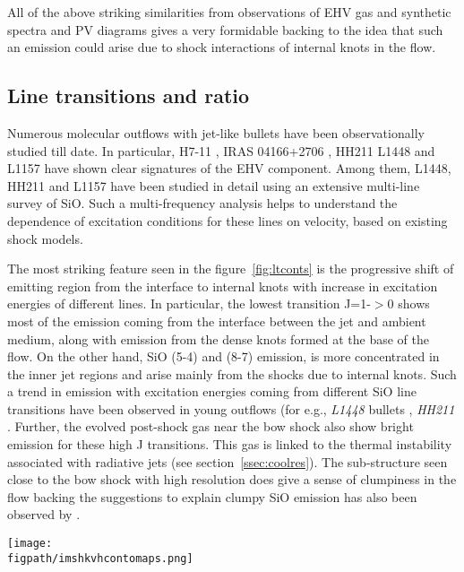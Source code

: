 \documentclass[useAMS,usenatbib]{mn2e}
\newcommand{\figpath}{/Users/bhargavvaidya/MyProject/work/Leeds_Uni/SiOJets_New/PAPER/PFIGS/}
\begin{document}
All of the above striking similarities from observations of EHV gas
and synthetic spectra and PV diagrams gives a very formidable backing
to the idea that such an emission could arise due to shock interactions of
internal knots in the flow. 

\subsection{Line transitions and ratio}
Numerous molecular outflows with jet-like bullets have been
observationally studied till date. In particular, H7-11
\citep{Bachiller:1998p14725}, IRAS 04166+2706
\citep{SantiagoGarcia:2009p13972, Tafalla:2010p14759}, HH211 \citep{Nisini:2002p14418}
L1448 \citep{Bachiller:1991p14732,Nisini:2007p13128,
  Tafalla:2010p14759} and L1157 \citep{Nisini:2007p13128} have
shown clear signatures of the EHV component. Among them, L1448, HH211 and
L1157 have been studied in detail using an extensive multi-line
survey of SiO. Such a multi-frequency analysis helps to understand the dependence of
excitation conditions for these lines on velocity, based on existing shock
models.  
%

The most striking feature seen in the figure~\ref{fig:ltconts} is the progressive shift of
emitting region from the interface to internal knots with increase in
excitation energies of different lines. In particular, the lowest
transition J=1-$>$0 shows most of the emission coming from the
interface between the jet and ambient medium, along with emission from
the dense knots formed at the base of the flow. On the other hand, SiO (5-4) and (8-7) emission, 
is more concentrated in the inner jet regions and arise mainly from
the shocks due to internal knots. Such a trend in emission with excitation energies coming from different SiO line transitions
have been observed in young outflows (for e.g., {\it{L1448}}
bullets \citep{Nisini:2007p13128}, {\it{HH211}}
\citep{Chandler:2001p14376, Nisini:2002p14418,
  Hirano:2006p14411}. Further, the evolved post-shock gas near the
bow shock also show bright emission for these high J transitions. 
This gas is linked to the thermal instability associated with
radiative jets (see section~\ref{ssec:coolres}). The sub-structure seen close to the
bow shock with high resolution does give a sense of clumpiness
in the flow backing the suggestions to explain clumpy SiO emission has
also been observed by \cite{Chandler:2001p14376}.
%

\begin{figure*}
 \texttt{[image: \\figpath/imshkvhcontomaps.png]}
 \caption{Symmetrical contour maps of multi-line integrated SiO
   emission convolved with a 2\arcsec beam obtained using parameters of the reference run. The contour colors represent different intenties in Kelvins, i.e,
   20.0({\it red}), 10.0({\it green}), 5.0({\it blue}), 1.0({\it
     magenta}), 0.5({\it cyan}), 0.1({\it black}).} 
\label{fig:ltconts}
\end{figure*}
\end{document}

